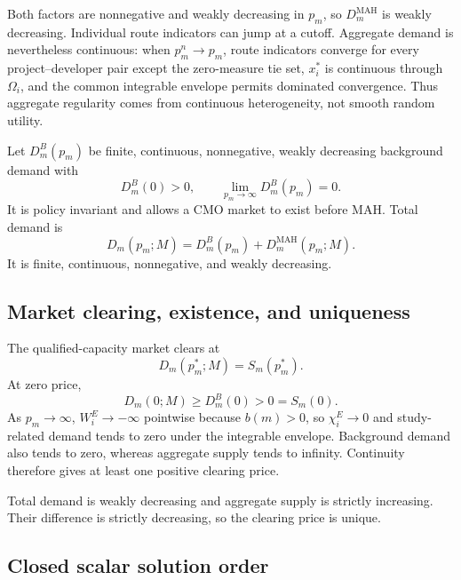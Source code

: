 Both factors are nonnegative and weakly decreasing in \(p_m\), so
\(D_m^{\mathrm{MAH}}\) is weakly decreasing. Individual route indicators can
jump at a cutoff. Aggregate demand is nevertheless continuous: when
\(p_m^n\to p_m\), route indicators converge for every project--developer
pair except the zero-measure tie set, \(x_i^*\) is continuous through
\(\Omega_i\), and the common integrable envelope permits dominated
convergence. Thus aggregate regularity comes from continuous heterogeneity,
not smooth random utility.

Let \(D_m^B(p_m)\) be finite, continuous, nonnegative, weakly decreasing
background demand with
\[
  D_m^B(0)>0,
  \qquad
  \lim_{p_m\to\infty}D_m^B(p_m)=0.
\]
It is policy invariant and allows a CMO market to exist before MAH. Total
demand is
\begin{equation}
  D_m(p_m;M)
  =
  D_m^B(p_m)
  +
  D_m^{\mathrm{MAH}}(p_m;M).
  \label{eq:p06-total-demand}
\end{equation}
It is finite, continuous, nonnegative, and weakly decreasing.

\subsection{Market clearing, existence, and uniqueness}
\label{subsec:p06-clearing}

The qualified-capacity market clears at
\begin{equation}
  D_m(p_m^*;M)=S_m(p_m^*).
  \label{eq:p06-market-clearing}
\end{equation}
At zero price,
\begin{equation}
  D_m(0;M)\geq D_m^B(0)>0=S_m(0).
  \label{eq:p06-existence-boundaries}
\end{equation}
As \(p_m\to\infty\), \(W_i^E\to-\infty\) pointwise because
\(b(m)>0\), so \(\chi_i^E\to0\) and study-related demand tends to zero
under the integrable envelope. Background demand also tends to zero, whereas
aggregate supply tends to infinity. Continuity therefore gives at least one
positive clearing price.

Total demand is weakly decreasing and aggregate supply is strictly
increasing. Their difference is strictly decreasing, so the clearing price
is unique.

\subsection{Closed scalar solution order}
\label{subsec:p06-solution-order}

